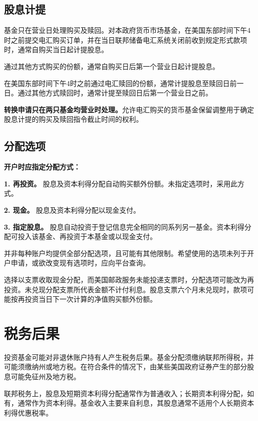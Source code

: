 \documentclass[UTF8,fontset=none,11pt,a4paper]{ctexart}
\begin{document}
\subsection*{股息计提}
基金只在营业日处理购买及赎回。对本政府货币市场基金，在美国东部时间下午4时之前提交电汇购买订单，并在当日联邦储备电汇系统关闭前收到规定形式款项时，通常自购买当日起\allowbreak\mbox{计提股息。}


通过其他方式购买的份额，通常自购买日后第一个营业日起\allowbreak\mbox{计提股息。}


在美国东部时间下午4时之前通过电汇赎回的份额，通常计提股息至赎回日前一日。通过其他方式赎回时，通常计提至赎回日后第一个营\allowbreak\mbox{业日之前。}


\textbf{转换申请只在两只基金均营业时处理。}允许电汇购买的货币基金保留调整用于确定股息计提的购买及赎回指令截止时\allowbreak\mbox{间的权利。}


\subsection*{分配选项}
\textbf{开户时应指定分配方式：}


\textbf{1. 再投资。} 股息及资本利得分配自动购买额外份额。未指定选项时，采\allowbreak\mbox{用此方式。}


\textbf{2. 现金。} 股息及资本利得分配以\allowbreak\mbox{现金支付。}


\textbf{3. 指定股息。} 股息自动投资于登记信息完全相同的同系列另一基金。资本利得分配可投入该基金、再投资于本基金或以\allowbreak\mbox{现金支付。}


并非每种账户均提供全部分配选项，且可能有其他限制。希望使用的选项未列于开户申请，或欲改变现有选项时，应向\allowbreak\mbox{平台查询。}


选择以支票收取现金分配，而美国邮政服务未能投递支票时，分配选项可能改为再投资。未兑现分配支票所代表金额不计付利息。股息支票六个月未兑现时，款项可能按再投资当日下一次计算的净值购买\allowbreak\mbox{额外份额。}


\section*{税务后果}
投资基金可能对非退休账户持有人产生税务后果。基金分配须缴纳联邦所得税，并可能须缴纳州或地方税。在符合条件的情况下，由某些美国政府证券产生的部分股息可能免征州\allowbreak\mbox{及地方税。}


联邦税务上，股息及短期资本利得分配通常作为普通收入；长期资本利得分配，如有，通常作为资本利得。基金收入主要来自利息，其股息通常不适用个人长期资本利得\allowbreak\mbox{优惠税率。}
\end{document}
